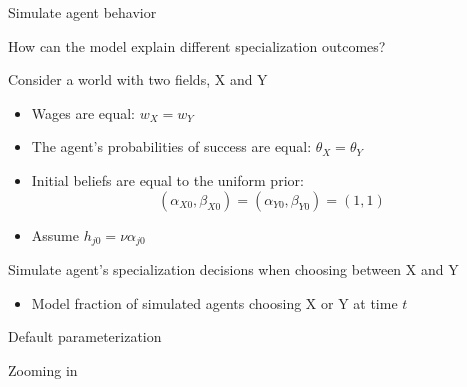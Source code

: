 \begin{frame}{Simulate agent behavior}\label{simulate}


How can the model explain different specialization outcomes?

\vspace{3ex}
Consider a world with two fields, X and Y
\begin{itemize}
    \item Wages are equal: $w_X = w_Y$
    \item The agent's probabilities of success are equal: $\theta_X = \theta_Y$
    \item Initial beliefs are equal to the uniform prior: \hyperlink{model_beta_11}{}
    \begin{equation*}
        (\alpha_{X0}, \beta_{X0}) = (\alpha_{Y0}, \beta_{Y0}) = (1, 1)
    \end{equation*}
    \item Assume $h_{j0} = \nu \alpha_{j0}$ \hyperlink{sim_parameterization}{}
\end{itemize}

\vspace{3ex}
Simulate agent's specialization decisions when choosing between X and Y
\begin{itemize}
    \item Model fraction of simulated agents choosing X or Y at time $t$ 
\end{itemize}


\end{frame}

\begin{frame}{Default parameterization}\label{sim_default}

% 
\begin{figure}
\centering

\end{figure}

\hyperlink{model_beta_11}{}
\end{frame}

\begin{frame}{Zooming in}


\begin{figure}
\centering

\end{figure}


\end{frame}

